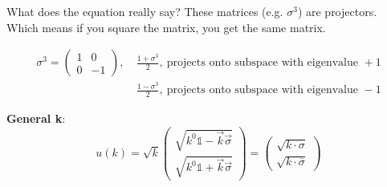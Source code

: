 \documentclass[11pt]{article}
\begin{document}
	What does the equation really say? These matrices (e.g. $\sigma^3$) are projectors. Which means if you square the matrix, you get the same matrix. 
	
	\begin{align*}
	\sigma^3 = \begin{pmatrix}
		1 & 0 \\ 0 & -1
	\end{pmatrix}, &\ \frac{1+\sigma^3}{2},\ \text{projects onto subspace with eigenvalue } +1\\
	&\ \frac{1-\sigma^3}{2},\ \text{projects onto subspace with eigenvalue } -1
	\end{align*}

		\textbf{General k}: $$u(k) = \sqrt{k} \begin{pmatrix}
			\sqrt{k^0 \mathbb{1} - \vec{k}\vec{\sigma}}\\
			\sqrt{k^0\mathbb{1} + \vec{k}\vec{\sigma}}
		\end{pmatrix} = \begin{pmatrix}
		\sqrt{k\cdot \sigma}\\ \sqrt{k\cdot \bar{\sigma}}
	\end{pmatrix}$$
\end{document}
